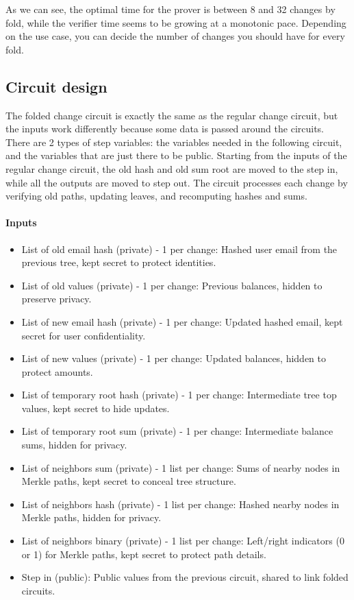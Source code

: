 As we can see, the optimal time for the prover is between 8 and 32 changes by fold, while the verifier time seems to be growing at a monotonic pace.
Depending on the use case, you can decide the number of changes you should have for every fold.

\subsection{Circuit design}
The folded change circuit is exactly the same as the regular change circuit, but the inputs work differently because some data is passed around the circuits.
There are 2 types of step variables: the variables needed in the following circuit, and the variables that are just there to be public.
Starting from the inputs of the regular change circuit, the old hash and old sum root are moved to the step in, while all the outputs are moved to step out. 
The circuit processes each change by verifying old paths, updating leaves, and recomputing hashes and sums.

\paragraph{Inputs}
\begin{itemize}
   \item List of old email hash (private) - 1 per change: Hashed user email from the previous tree, kept secret to protect identities.
   \item List of old values (private) - 1 per change: Previous balances, hidden to preserve privacy.
   \item List of new email hash (private) - 1 per change: Updated hashed email, kept secret for user confidentiality.
   \item List of new values (private) - 1 per change: Updated balances, hidden to protect amounts.
   \item List of temporary root hash (private) - 1 per change: Intermediate tree top values, kept secret to hide updates.
   \item List of temporary root sum (private) - 1 per change: Intermediate balance sums, hidden for privacy.
   \item List of neighbors sum (private) - 1 list per change: Sums of nearby nodes in Merkle paths, kept secret to conceal tree structure.
   \item List of neighbors hash (private) - 1 list per change: Hashed nearby nodes in Merkle paths, hidden for privacy.
   \item List of neighbors binary (private) - 1 list per change: Left/right indicators (0 or 1) for Merkle paths, kept secret to protect path details.
   \item Step in (public): Public values from the previous circuit, shared to link folded circuits.
   \end{itemize}

